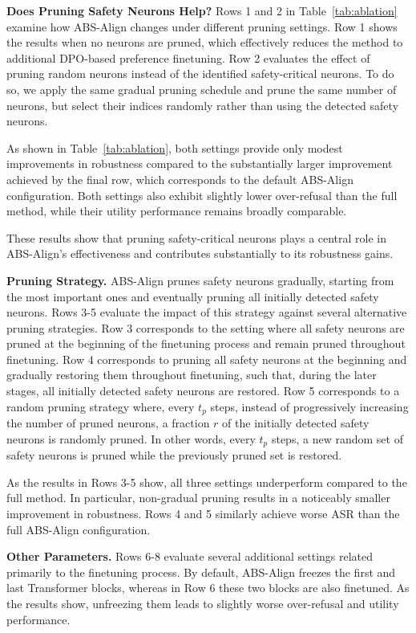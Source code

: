 \textbf{Does Pruning Safety Neurons Help?} Rows 1 and 2 in Table~\ref{tab:ablation} examine how ABS-Align changes under different pruning settings. Row 1 shows the results when no neurons are pruned, which effectively reduces the method to additional DPO-based preference finetuning. Row 2 evaluates the effect of pruning random neurons instead of the identified safety-critical neurons. To do so, we apply the same gradual pruning schedule and prune the same number of neurons, but select their indices randomly rather than using the detected safety neurons.

As shown in Table~\ref{tab:ablation}, both settings provide only modest improvements in robustness compared to the substantially larger improvement achieved by the final row, which corresponds to the default ABS-Align configuration. Both settings also exhibit slightly lower over-refusal than the full method, while their utility performance remains broadly comparable.

These results show that pruning safety-critical neurons plays a central role in ABS-Align's effectiveness and contributes substantially to its robustness gains.

\textbf{Pruning Strategy.} ABS-Align prunes safety neurons gradually, starting from the most important ones and eventually pruning all initially detected safety neurons. Rows 3-5 evaluate the impact of this strategy against several alternative pruning strategies. Row 3 corresponds to the setting where all safety neurons are pruned at the beginning of the finetuning process and remain pruned throughout finetuning. Row 4 corresponds to pruning all safety neurons at the beginning and gradually restoring them throughout finetuning, such that, during the later stages, all initially detected safety neurons are restored. Row 5 corresponds to a random pruning strategy where, every $t_p$ steps, instead of progressively increasing the number of pruned neurons, a fraction $r$ of the initially detected safety neurons is randomly pruned. In other words, every $t_p$ steps, a new random set of safety neurons is pruned while the previously pruned set is restored.

As the results in Rows 3-5 show, all three settings underperform compared to the full method. In particular, non-gradual pruning results in a noticeably smaller improvement in robustness. Rows 4 and 5 similarly achieve worse ASR than the full ABS-Align configuration.

\textbf{Other Parameters.} Rows 6-8 evaluate several additional settings related primarily to the finetuning process. By default, ABS-Align freezes the first and last Transformer blocks, whereas in Row 6 these two blocks are also finetuned. As the results show, unfreezing them leads to slightly worse over-refusal and utility performance.

